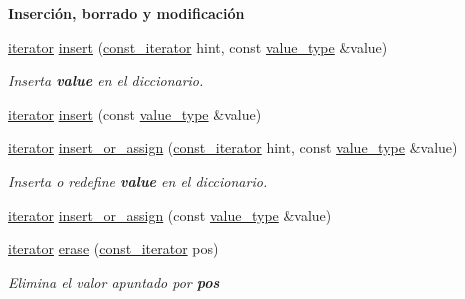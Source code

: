 \begin{Indent}{\bf Inserción, borrado y modificación}\par
\begin{DoxyCompactItemize}
\item 
\hyperlink{classaed2_1_1map_1_1iterator}{iterator} \hyperlink{classaed2_1_1map_a6941cde9a79c27f054b5c97a587a1854_a6941cde9a79c27f054b5c97a587a1854}{insert} (\hyperlink{classaed2_1_1map_1_1const__iterator}{const\+\_\+iterator} hint, const \hyperlink{classaed2_1_1map_a719db98e0ff9a837610f76be33264680_a719db98e0ff9a837610f76be33264680}{value\+\_\+type} \&value)
\begin{DoxyCompactList}\small\item\em Inserta {\bfseries value} en el diccionario. \end{DoxyCompactList}\item 
\hyperlink{classaed2_1_1map_1_1iterator}{iterator} \hyperlink{classaed2_1_1map_a60aacba06b1579630b3c8e996cf248c8_a60aacba06b1579630b3c8e996cf248c8}{insert} (const \hyperlink{classaed2_1_1map_a719db98e0ff9a837610f76be33264680_a719db98e0ff9a837610f76be33264680}{value\+\_\+type} \&value)
\item 
\hyperlink{classaed2_1_1map_1_1iterator}{iterator} \hyperlink{classaed2_1_1map_a2ef6723c183916276b0afc4a4c721475_a2ef6723c183916276b0afc4a4c721475}{insert\+\_\+or\+\_\+assign} (\hyperlink{classaed2_1_1map_1_1const__iterator}{const\+\_\+iterator} hint, const \hyperlink{classaed2_1_1map_a719db98e0ff9a837610f76be33264680_a719db98e0ff9a837610f76be33264680}{value\+\_\+type} \&value)
\begin{DoxyCompactList}\small\item\em Inserta o redefine {\bfseries value} en el diccionario. \end{DoxyCompactList}\item 
\hyperlink{classaed2_1_1map_1_1iterator}{iterator} \hyperlink{classaed2_1_1map_a9128a806713bcc999ebd8a97ab77e765_a9128a806713bcc999ebd8a97ab77e765}{insert\+\_\+or\+\_\+assign} (const \hyperlink{classaed2_1_1map_a719db98e0ff9a837610f76be33264680_a719db98e0ff9a837610f76be33264680}{value\+\_\+type} \&value)
\item 
\hyperlink{classaed2_1_1map_1_1iterator}{iterator} \hyperlink{classaed2_1_1map_ad8e796bf9c9c558e5ce6b61e116253fe_ad8e796bf9c9c558e5ce6b61e116253fe}{erase} (\hyperlink{classaed2_1_1map_1_1const__iterator}{const\+\_\+iterator} pos)
\begin{DoxyCompactList}\small\item\em Elimina el valor apuntado por {\bfseries pos} \end{DoxyCompactList}\item 

\end{DoxyCompactItemize}
\end{Indent}
